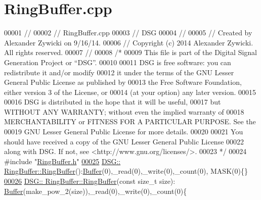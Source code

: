 \hypertarget{_ring_buffer_8cpp_source}{\section{Ring\+Buffer.\+cpp}
\label{_ring_buffer_8cpp_source}
}

\begin{DoxyCode}
00001 \textcolor{comment}{//}
00002 \textcolor{comment}{//  RingBuffer.cpp}
00003 \textcolor{comment}{//  DSG}
00004 \textcolor{comment}{//}
00005 \textcolor{comment}{//  Created by Alexander Zywicki on 9/16/14.}
00006 \textcolor{comment}{//  Copyright (c) 2014 Alexander Zywicki. All rights reserved.}
00007 \textcolor{comment}{//}
00008 \textcolor{comment}{/*}
00009 \textcolor{comment}{ This file is part of the Digital Signal Generation Project or “DSG”.}
00010 \textcolor{comment}{}
00011 \textcolor{comment}{ DSG is free software: you can redistribute it and/or modify}
00012 \textcolor{comment}{ it under the terms of the GNU Lesser General Public License as published by}
00013 \textcolor{comment}{ the Free Software Foundation, either version 3 of the License, or}
00014 \textcolor{comment}{ (at your option) any later version.}
00015 \textcolor{comment}{}
00016 \textcolor{comment}{ DSG is distributed in the hope that it will be useful,}
00017 \textcolor{comment}{ but WITHOUT ANY WARRANTY; without even the implied warranty of}
00018 \textcolor{comment}{ MERCHANTABILITY or FITNESS FOR A PARTICULAR PURPOSE.  See the}
00019 \textcolor{comment}{ GNU Lesser General Public License for more details.}
00020 \textcolor{comment}{}
00021 \textcolor{comment}{ You should have received a copy of the GNU Lesser General Public License}
00022 \textcolor{comment}{ along with DSG.  If not, see <http://www.gnu.org/licenses/>.}
00023 \textcolor{comment}{ */}
00024 \textcolor{preprocessor}{#include "\hyperlink{_ring_buffer_8h}{RingBuffer.h}"}
\hypertarget{_ring_buffer_8cpp_source_l00025}{}\hyperlink{class_d_s_g_1_1_ring_buffer_a3136c9debb3c422adb1d5835e11b2b99}{00025} \hyperlink{class_d_s_g_1_1_ring_buffer_a3136c9debb3c422adb1d5835e11b2b99}{DSG:: RingBuffer::RingBuffer}():\hyperlink{class_d_s_g_1_1_buffer}{Buffer}(0),\_read(0),\_write(0),\_count(0),
      MASK(0)\{\}
\hypertarget{_ring_buffer_8cpp_source_l00026}{}\hyperlink{class_d_s_g_1_1_ring_buffer_ae9859fd3ad18961de494d8b50fe4763e}{00026} \hyperlink{class_d_s_g_1_1_ring_buffer_a3136c9debb3c422adb1d5835e11b2b99}{DSG:: RingBuffer::RingBuffer}(\textcolor{keyword}{const} \textcolor{keywordtype}{size\_t} size):
      \hyperlink{class_d_s_g_1_1_buffer}{Buffer}(make\_pow\_2(size)),\_read(0),\_write(0),\_count(0)\{

\end{DoxyCode}
